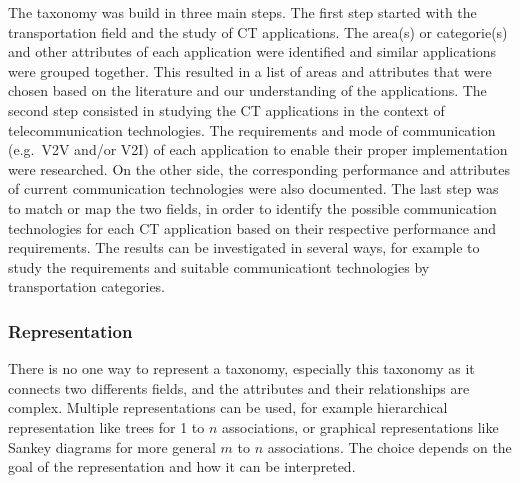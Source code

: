 The taxonomy was build in three main steps. The first step started with the transportation field and the study of \acrshort{CT} applications. The area(s) or categorie(s) and other attributes of each application were identified and similar applications were grouped together. This resulted in a list of areas and attributes that were chosen based on the literature and our understanding of the applications. 
The second step consisted in studying the \acrshort{CT} applications in the context of telecommunication technologies. The requirements and mode of communication (e.g.\ \acrshort{V2V} and/or \acrshort{V2I}) of each application to enable their proper implementation were researched. On the other side, the corresponding performance and attributes of current communication technologies were also documented. 
The last step was to match or map the two fields, in order to identify the possible communication technologies for each \acrshort{CT} application based on their respective performance and requirements. The results can be investigated in several ways, for example to study the requirements and suitable communicationt technologies by transportation categories. 

\subsubsection{Representation}
There is no one way to represent a taxonomy, especially this taxonomy as it connects two differents fields, and the attributes and their relationships are complex.
Multiple representations can be used, for example hierarchical representation like trees for 1 to $n$ associations, or graphical representations like Sankey diagrams for more general $m$ to $n$ associations. The choice depends on the goal of the representation and how it can be interpreted. 

